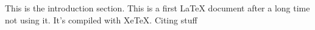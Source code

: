 This is the introduction section. 
This is a first \LaTeX{} document after a long time not using it. 
It's compiled with XeTeX.
Citing stuff \cite{kleppmanLocalfirstSoftwareYou2019}
